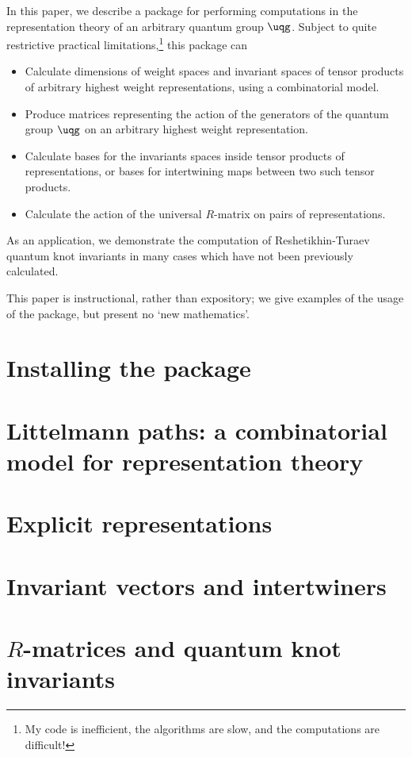 In this paper, we describe a \MMA package for performing
computations in the representation theory of an arbitrary quantum
group $\uqg$. Subject to quite restrictive practical
limitations,\footnote{My code is inefficient, the algorithms are
slow, and the computations are difficult!} this package can
\begin{itemize}
\item Calculate dimensions of weight spaces and invariant spaces of
tensor products of arbitrary highest weight representations, using a
combinatorial model.
\item Produce matrices representing the action of the generators of the quantum group
$\uqg$ on an arbitrary highest weight representation.
\item Calculate bases for the invariants spaces inside tensor
products of representations, or bases for intertwining maps between
two such tensor products.
\item Calculate the action of the universal $R$-matrix on pairs of
representations.
\end{itemize}
As an application, we demonstrate the computation of
Reshetikhin-Turaev quantum knot invariants in many cases which have
not been previously calculated.

This paper is instructional, rather than expository; we give
examples of the usage of the package, but present no `new
mathematics'.

\section{Installing the  package}

\section{Littelmann paths: a combinatorial model for representation theory}

\section{Explicit representations}

\section{Invariant vectors and intertwiners}

\section{$R$-matrices and quantum knot invariants}
